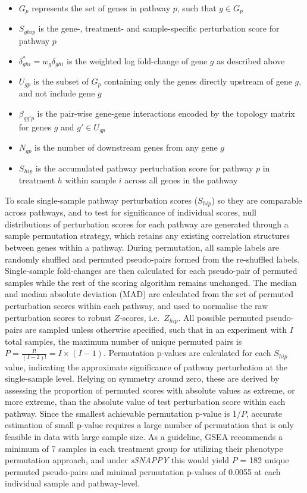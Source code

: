 \documentclass[9pt,a4paper,]{extarticle}
\begin{document}
\begin{itemize}
\item
  \(G_p\) represents the set of genes in pathway \(p\), such that \(g \in G_p\)
\item
  \(S_{ghip}\) is the gene-, treatment- and sample-specific perturbation score for pathway \(p\)
\item
  \(\delta_{ghi}^* = w_g\delta_{ghi}\) is the weighted log fold-change of gene \(g\) as described above
\item
  \(U_{gp}\) is the subset of \(G_p\) containing only the genes directly upstream of gene \(g\), and not include gene \(g\)
\item
  \(\beta_{gg'p}\) is the pair-wise gene-gene interactions\citep{Tarca2009} encoded by the topology matrix for genes \(g\) and \(g' \in U_{gp}\)
\item
  \(N_{gp}\) is the number of downstream genes from any gene \(g\)
\item
  \(S_{hip}\) is the accumulated pathway perturbation score for pathway \(p\) in treatment \(h\) within sample \(i\) across all genes in the pathway
\end{itemize}

To scale single-sample pathway perturbation scores (\(S_{hip}\)) so they are comparable across pathways, and to test for significance of individual scores, null distributions of perturbation scores for each pathway are generated through a sample permutation strategy, which retains any existing correlation structures between genes within a pathway.
During permutation, all sample labels are randomly shuffled and permuted pseudo-pairs formed from the re-shuffled labels.
Single-sample fold-changes are then calculated for each pseudo-pair of permuted samples while the rest of the scoring algorithm remains unchanged.
The median and median absolute deviation (MAD) are calculated from the set of permuted perturbation scores within each pathway, and used to normalise the raw perturbation scores to robust \(Z\)-scores, i.e.~\(Z_{hip}\).
All possible permuted pseudo-pairs are sampled unless otherwise specified, such that in an experiment with \(I\) total samples, the maximum number of unique permuted pairs is \(P = \frac{{I!}}{{(I-2)!}} = I \times (I-1)\).
Permutation p-values are calculated for each \(S_{hip}\) value, indicating the approximate significance of pathway perturbation at the single-sample level.
Relying on symmetry around zero, these are derived by assessing the proportion of permuted scores with absolute values as extreme, or more extreme, than the absolute value of test perturbation score within each pathway\citep{Theo2009}.
Since the smallest achievable permutation p-value is 1/\(P\), accurate estimation of small p-value requires a large number of permutation that is only feasible in data with large sample size.
As a guideline, GSEA recommends a minimum of 7 samples in each treatment group for utilizing their phenotype permutation approach\citep{GSEAUserGuide}, and under \emph{sSNAPPY} this would yield \(P\) = 182 unique permuted pseudo-pairs and minimal permutation p-values of 0.0055 at each individual sample and pathway-level.
\end{document}
